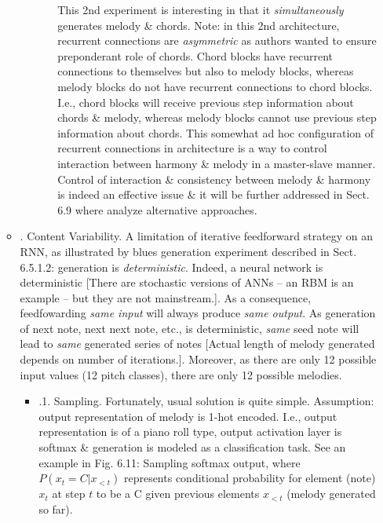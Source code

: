 \documentclass{article}
\begin{document}
\begin{itemize}
\begin{itemize}
\begin{itemize}
\begin{itemize}
				This 2nd experiment is interesting in that it {\it simultaneously} generates melody \& chords. Note: in this 2nd architecture, recurrent connections are {\it asymmetric} as authors wanted to ensure preponderant role of chords. Chord blocks have recurrent connections to themselves but also to melody blocks, whereas melody blocks do not have recurrent connections to chord blocks. I.e., chord blocks will receive previous step information about chords \& melody, whereas melody blocks cannot use previous step information about chords. This somewhat ad hoc configuration of recurrent connections in architecture is a way to control interaction between harmony \& melody in a master-slave manner. Control of interaction \& consistency between melody \& harmony is indeed an effective issue \& it will be further addressed in Sect. 6.9 where analyze alternative approaches.
			\end{itemize}
		\end{itemize}
		\item {. Content Variability.} A limitation of iterative feedforward strategy on an RNN, as illustrated by blues generation experiment described in Sect. 6.5.1.2: generation is {\it deterministic}. Indeed, a neural network is deterministic [There are stochastic versions of ANNs -- an RBM is an example -- but they are not mainstream.]. As a consequence, feedfowarding {\it same input} will always produce {\it same output}. As generation of next note, next next note, etc., is deterministic, {\it same} seed note will lead to {\it same} generated series of notes [Actual length of melody generated depends on number of iterations.]. Moreover, as there are only 12 possible input values (12 pitch classes), there are only 12 possible melodies.
		\begin{itemize}
			\item {.1. Sampling.} Fortunately, usual solution is quite simple. Assumption: output representation of melody is 1-hot encoded. I.e., output representation is of a piano roll type, output activation layer is softmax \& generation is modeled as a classification task. See an example in {\sf Fig. 6.11: Sampling softmax output}, where $P(x_t = C|x_{<t})$ represents conditional probability for element (note) $x_t$ at step $t$ to be a C given previous elements $x_{<t}$ (melody generated so far).
			

\end{itemize}
\end{itemize}
\end{itemize}
\end{document}

